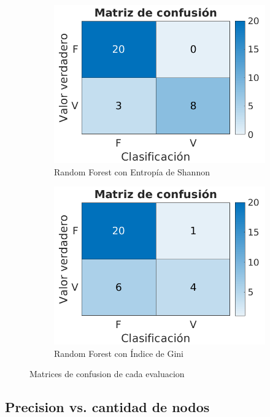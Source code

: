 \documentclass[a4paper]{article}
\begin{document}
\begin{figure}[h]
\begin{subfigure}{.4\textwidth}
      \includegraphics[width=\linewidth]{img/cm-rf-shannon.png}
      \caption{Random Forest con Entropía de Shannon}
      \label{titanic-cm:sfig3}
    \end{subfigure}
    \begin{subfigure}{.4\textwidth}
      \centering
      \includegraphics[width=\linewidth]{img/cm-rf-gini.png}
      \caption{Random Forest con Índice de Gini}
      \label{titanic-cm:sfig4}
    \end{subfigure}
    \caption{Matrices de confusion de cada evaluacion}
    \label{titanic-cm:fig}
  \end{figure}

\subsection{Precision vs. cantidad de nodos}

\newpage
\end{document}
